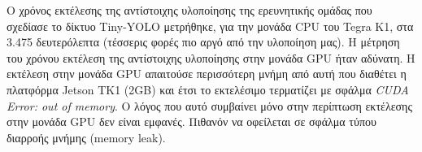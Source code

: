 Ο χρόνος εκτέλεσης της αντίστοιχης υλοποίησης της ερευνητικής ομάδας που
σχεδίασε το δίκτυο Tiny-YOLO μετρήθηκε, για την μονάδα CPU του Tegra K1,
στα 3.475 δευτερόλεπτα (τέσσερις φορές πιο αργό από την υλοποίηση
μας).
Η μέτρηση του χρόνου εκτέλεση της αντίστοιχης
υλοποίησης στην μονάδα GPU ήταν αδύνατη. Η εκτέλεση στην μονάδα GPU
απαιτούσε περισσότερη μνήμη από αυτή που διαθέτει η πλατφόρμα Jetson TK1 (2GB) και έτσι
το εκτελέσιμο τερματίζει με σφάλμα \emph{CUDA Error: out of memory}.
Ο λόγος που αυτό συμβαίνει μόνο στην περίπτωση εκτέλεσης στην μονάδα GPU
δεν είναι εμφανές. Πιθανόν να οφείλεται σε σφάλμα τύπου διαρροής μνήμης (memory leak).

